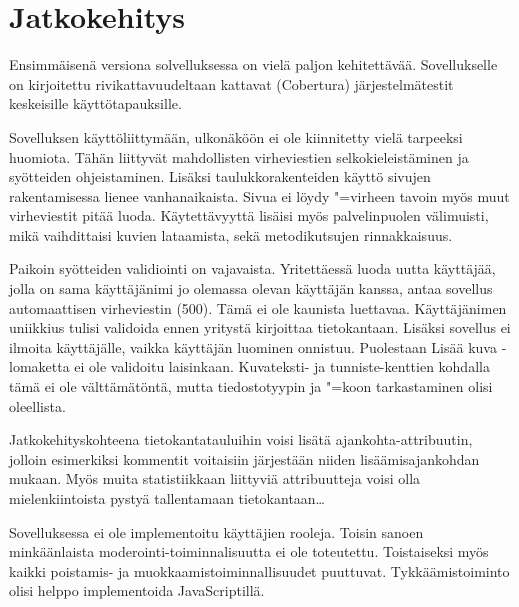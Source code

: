 \documentclass[finnish,colorlinks,headings=normal,parskip=half,footsepline]{scrartcl}
\begin{document}
\section{Jatkokehitys}
Ensimmäisenä versiona solvelluksessa on vielä paljon kehitettävää. Sovellukselle on kirjoitettu rivikattavuudeltaan kattavat (Cobertura) järjestelmätestit keskeisille käyttötapauksille.

Sovelluksen käyttöliittymään, ulkonäköön ei ole kiinnitetty vielä tarpeeksi huomiota. Tähän liittyvät mahdollisten virheviestien selkokieleistäminen ja syötteiden ohjeistaminen. Lisäksi taulukkorakenteiden käyttö sivujen rakentamisessa lienee vanhanaikaista. Sivua ei löydy "=virheen tavoin myös muut virheviestit pitää luoda. Käytettävyyttä lisäisi myös palvelinpuolen välimuisti, mikä vaihdittaisi kuvien lataamista, sekä metodikutsujen rinnakkaisuus.

Paikoin syötteiden validiointi on vajavaista. Yritettäessä luoda uutta käyttäjää, jolla on sama käyttäjänimi jo olemassa olevan käyttäjän kanssa, antaa sovellus automaattisen virheviestin (500). Tämä ei ole kaunista luettavaa. Käyttäjänimen uniikkius tulisi validoida ennen yritystä kirjoittaa tietokantaan. Lisäksi sovellus ei ilmoita käyttäjälle, vaikka käyttäjän luominen onnistuu. Puolestaan Lisää kuva -lomaketta ei ole validoitu laisinkaan. Kuvateksti- ja tunniste-kenttien kohdalla tämä ei ole välttämätöntä, mutta tiedostotyypin ja "=koon tarkastaminen olisi oleellista.

Jatkokehityskohteena tietokantatauluihin voisi lisätä ajankohta-attribuutin, jolloin esimerkiksi kommentit voitaisiin järjestään niiden lisäämisajankohdan mukaan. Myös muita statistiikkaan liittyviä attribuutteja voisi olla mielenkiintoista pystyä tallentamaan tietokantaan\ldots

Sovelluksessa ei ole implementoitu käyttäjien rooleja. Toisin sanoen minkäänlaista moderointi-toiminnalisuutta ei ole toteutettu. Toistaiseksi myös kaikki poistamis- ja muokkaamistoiminnallisuudet puuttuvat. Tykkäämistoiminto olisi helppo implementoida JavaScriptillä.
\end{document}
